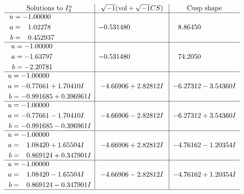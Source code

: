 \documentclass[1p]{elsarticle_modified}
\theoremstyle{definition}
\newcommand{\I}{\sqrt{-1}}
\begin{document}
$$\begin{array}{c|c|c}  
\text{Solutions to }I^u_{3}& \I (\text{vol} + \sqrt{-1}CS) & \text{Cusp shape}\\
 \hline 
\begin{aligned}
u &= -1.00000\phantom{ +0.000000I} \\
a &= \phantom{-}1.02278\phantom{ +0.000000I} \\
b &= \phantom{-}0.452937\phantom{ +0.000000I}\end{aligned}
 & -0.531480\phantom{ +0.000000I} & \phantom{-}8.86450\phantom{ +0.000000I} \\ \hline\begin{aligned}
u &= -1.00000\phantom{ +0.000000I} \\
a &= -1.63797\phantom{ +0.000000I} \\
b &= -2.20781\phantom{ +0.000000I}\end{aligned}
 & -0.531480\phantom{ +0.000000I} & \phantom{-}74.2050\phantom{ +0.000000I} \\ \hline\begin{aligned}
u &= -1.00000\phantom{ +0.000000I} \\
a &= -0.77661 + 1.70410 I \\
b &= -0.991685 + 0.396961 I\end{aligned}
 & -4.66906 + 2.82812 I & -6.27312 - 3.54360 I \\ \hline\begin{aligned}
u &= -1.00000\phantom{ +0.000000I} \\
a &= -0.77661 - 1.70410 I \\
b &= -0.991685 - 0.396961 I\end{aligned}
 & -4.66906 - 2.82812 I & -6.27312 + 3.54360 I \\ \hline\begin{aligned}
u &= -1.00000\phantom{ +0.000000I} \\
a &= \phantom{-}1.08420 + 1.65504 I \\
b &= \phantom{-}0.869124 + 0.347901 I\end{aligned}
 & -4.66906 + 2.82812 I & -4.76162 - 1.20354 I \\ \hline\begin{aligned}
u &= -1.00000\phantom{ +0.000000I} \\
a &= \phantom{-}1.08420 - 1.65504 I \\
b &= \phantom{-}0.869124 - 0.347901 I\end{aligned}
 & -4.66906 - 2.82812 I & -4.76162 + 1.20354 I\\
 \hline 
 \end{array}$$\newpage
\end{document}
